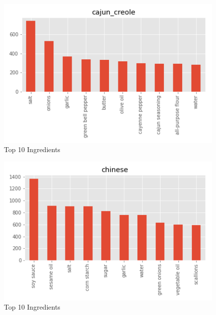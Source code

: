 \documentclass[sigconf]{acmart}
\begin{document}
\begin{figure}[!ht]
  \centering\includegraphics[width=\columnwidth]{images/cajun_creole_10_most_used_ingredients.png}
  \caption{Top 10 Ingredients }\label{f:cajun_creole_10_most_used_ingredients}
\end{figure}

\begin{figure}[!ht]
  \centering\includegraphics[width=\columnwidth]{images/chinese_10_most_used_ingredients.png}
  \caption{Top 10 Ingredients }\label{f:chinese_10_most_used_ingredients}
\end{figure}
\end{document}
